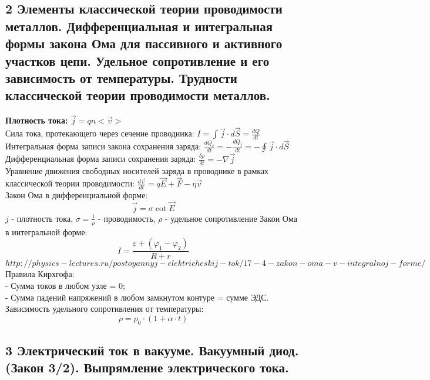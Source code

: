 \documentclass[a4paper,12pt]{article}
\begin{document}
\subsection{2	Элементы классической теории проводимости металлов. Дифференциальная и интегральная формы закона Ома для пассивного и активного участков цепи. Удельное сопротивление и его зависимость от температуры. Трудности классической теории проводимости металлов.}
\textbf{Плотность тока:} $\vec{j} = qn<\vec{v}>$\\
Сила тока, протекающего через сечение проводника: $I = \int \vec{j} \cdot d\vec{S} = \frac{dQ}{dt}$\\
Интегральная форма записи закона сохранения заряда: $\frac{dQ_v}{dt} = - \frac{dQ_j}{dt} = - \oint \vec{j} \cdot d\vec{S}$\\
Дифференциальная форма записи сохранения заряда: $\frac{\delta \rho}{\delta t} = - \nabla \vec{j}$\\
Уравнение движения свободных носителей заряда в проводнике в рамках классической теории проводимости: $\frac{d \vec{v}}{dt} = q \vec{E} + \vec{F} - \eta \vec{v}$\\
Закон Ома в дифференциальной форме:\\
\begin{equation}
	\vec{j} = \sigma \cot  \vec{E}
\end{equation}
$j$ - плотность тока, $\sigma = \frac{1}{\rho}$ - проводимость, $\rho$ - удельное сопротивление
Закон Ома в интегральной форме:\\
\begin{equation}
	I = \frac{\varepsilon + (\varphi _1 - \varphi _2)}{R + r}
\end{equation}
$http://physics-lectures.ru/postoyannyj-elektricheskij-tok/17-4-zakon-oma-v-integralnoj-forme/$
Правила Кирхгофа:\\
- Сумма токов в любом узле = 0;\\
- Сумма падений напряжений в любом замкнутом контуре = сумме ЭДС.\\
Зависимость удельного сопротивления от температуры:\\
\begin{equation}
	\rho = \rho _0 \cdot (1 + \alpha \cdot t)
\end{equation}


\subsection{3	Электрический ток в вакууме. Вакуумный диод. (Закон 3/2). Выпрямление электрического тока.}
\end{document}
